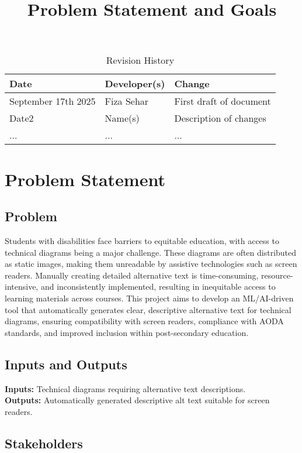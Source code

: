 \documentclass{article}
\title{Problem Statement and Goals\\\progname}
\author{\authname}
\date{}
\begin{document}
\maketitle

\begin{table}[hp]
\caption{Revision History} \label{TblRevisionHistory}
\begin{tabularx}{\textwidth}{llX}
\toprule
\textbf{Date} & \textbf{Developer(s)} & \textbf{Change}\\
\midrule
September 17th 2025 & Fiza Sehar & First draft of document\\
Date2 & Name(s) & Description of changes\\
... & ... & ...\\
\bottomrule
\end{tabularx}
\end{table}

\section{Problem Statement}

\subsection{Problem}
Students with disabilities face barriers to equitable education, with access to technical diagrams being a major challenge. These diagrams are often distributed as static images, making them unreadable by assistive technologies such as screen readers. Manually creating detailed alternative text is time-consuming, resource-intensive, and inconsistently implemented, resulting in inequitable access to learning materials across courses. This project aims to develop an ML/AI-driven tool that automatically generates clear, descriptive alternative text for technical diagrams, ensuring compatibility with screen readers, compliance with AODA standards, and improved inclusion within post-secondary education.

\subsection{Inputs and Outputs}
\textbf{Inputs:} Technical diagrams requiring alternative text descriptions.\\
\textbf{Outputs:} Automatically generated descriptive alt text suitable for screen readers.
\subsection{Stakeholders}
\end{document}
